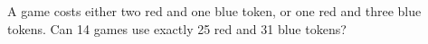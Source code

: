 A game costs either two red and one blue token, or one red and three blue tokens. Can 14 games use exactly 25 red and 31 blue tokens?
